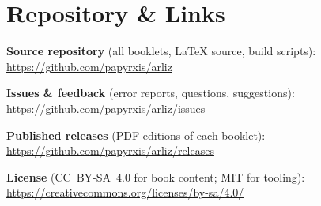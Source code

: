 \chapter*{Repository \& Links}

\noindent\textbf{Source repository} (all booklets, LaTeX source, build scripts):\\
\url{https://github.com/papyrxis/arliz}

\medskip

\noindent\textbf{Issues \& feedback} (error reports, questions, suggestions):\\
\url{https://github.com/papyrxis/arliz/issues}

\medskip

\noindent\textbf{Published releases} (PDF editions of each booklet):\\
\url{https://github.com/papyrxis/arliz/releases}

\medskip

\noindent\textbf{License} (CC~BY-SA~4.0 for book content; MIT for tooling):\\
\url{https://creativecommons.org/licenses/by-sa/4.0/}
